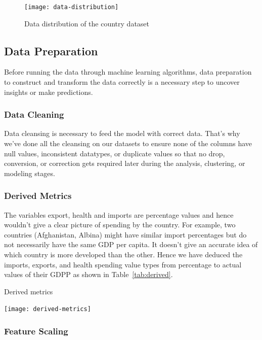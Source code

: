\documentclass{swfuthesise}
\begin{document}
\begin{figure}[!htp]
    \centering
    \texttt{[image: data-distribution]}
    \caption{Data distribution of the country dataset}
    \label{fig:distribution}
\end{figure}

\subsection{Data Preparation}

Before running the data through machine learning algorithms, data preparation to construct and transform the data correctly is a necessary step to uncover insights or make predictions.

\subsubsection{Data Cleaning}

Data cleansing is necessary to feed the model with correct data. That’s why we’ve done all the cleansing on our datasets to ensure none of the columns have null values, inconsistent datatypes, or duplicate values so that no drop, conversion, or correction gets required later during the analysis, clustering, or modeling stages.

\subsubsection{Derived Metrics}

The variables export, health and imports are percentage values and hence wouldn't give a
clear picture of spending by the country. For example, two countries (Afghanistan, Albina) might have similar import percentages but do not necessarily have the same
GDP per capita. It doesn't give an accurate idea of which country is more developed than
the other. Hence we have deduced the imports, exports, and health spending value types
from percentage to actual values of their GDPP as shown in Table~\ref{tab:derived}.

\begin{table}[htp]
  \centering%
  \caption{Derived metrics\label{tab:derived}}
  \texttt{[image: derived-metrics]}
\end{table}

\subsubsection{Feature Scaling}
\end{document}

